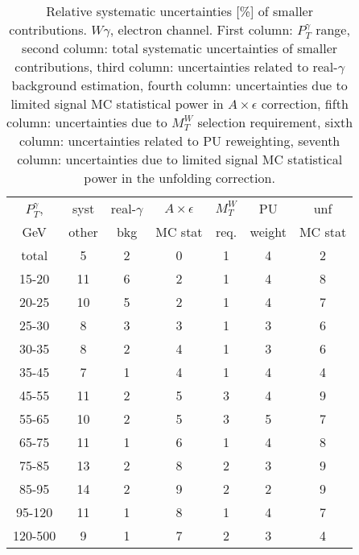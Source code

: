 \begin{table}[h]
  \scriptsize
  \begin{center}
  \caption{Relative systematic uncertainties [\%] of smaller contributions. $W\gamma$, electron channel. First column: $P_T^{\gamma}$ range, second column: total systematic uncertainties of smaller contributions, third column: uncertainties related to real-$\gamma$ background estimation, fourth column: uncertainties due to limited signal MC statistical power in $A\times\epsilon$ correction, fifth column: uncertainties due to $M_T^W$ selection requirement,  sixth column: uncertainties related to PU reweighting, seventh column:  uncertainties due to limited signal MC statistical power in the unfolding correction.}
  \begin{tabular}{|c|c|c|c|c|c|c|}
    $P_T^{\gamma}$,  & syst & real-$\gamma$ & $A\times\epsilon$ & $M_T^W$ & PU & unf\\
    GeV  & other & bkg & MC stat & req. & weight & MC stat\\ \hline
    total  & 5 & 2 & 0 & 1 & 4 & 2 \\ \hline
    15-20 & 11 & 6 & 2 & 1 & 4 & 8 \\ \hline
    20-25 & 10 & 5 & 2 & 1 & 4 & 7 \\ \hline
    25-30 & 8 & 3 & 3 & 1 & 3 & 6 \\ \hline
    30-35 & 8 & 2 & 4 & 1 & 3 & 6 \\ \hline
    35-45 & 7 & 1 & 4 & 1 & 4 & 4 \\ \hline
    45-55 & 11 & 2 & 5 & 3 & 4 & 9 \\ \hline
    55-65 & 10 & 2 & 5 & 3 & 5 & 7 \\ \hline
    65-75 & 11 & 1 & 6 & 1 & 4 & 8 \\ \hline
    75-85 & 13 & 2 & 8 & 2 & 3 & 9 \\ \hline
    85-95 & 14 & 2 & 9 & 2 & 2 & 9 \\ \hline
    95-120 & 11 & 1 & 8 & 1 & 4 & 7 \\ \hline
    120-500 & 9 & 1 & 7 & 2 & 3 & 4 \\ \hline
  \end{tabular}
  \label{tab:systInPercentSmallSysts_ELECTRON_WGamma}
  \end{center}
\end{table}
